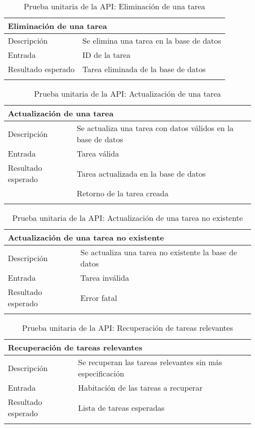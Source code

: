 \begin{longtable}{|p{} p{}|}
    \hline
    \multicolumn{2}{|l|}{\textbf{Eliminación de una tarea}} \\ \hline 
    Descripción                 & Se elimina una tarea en la base de datos \\ \hline
    Entrada                     & ID de la tarea \\ \hline
    Resultado esperado          & Tarea eliminada de la base de datos \\ \hline
    \caption{Prueba unitaria de la API: Eliminación de una tarea}
    \label{cp:u:api:eliminar_tarea}
\end{longtable}

\begin{longtable}{|p{} p{}|}
    \hline
    \multicolumn{2}{|l|}{\textbf{Actualización de una tarea}} \\ \hline 
    Descripción                 & Se actualiza una tarea con datos válidos en la base de datos \\ \hline
    Entrada                     & Tarea válida \\ \hline
    Resultado esperado          & Tarea actualizada en la base de datos \\
                                & Retorno de la tarea creada \\ \hline
    \caption{Prueba unitaria de la API: Actualización de una tarea}
    \label{cp:u:api:actualizar_tarea}
\end{longtable}

\begin{longtable}{|p{} p{}|}
    \hline
    \multicolumn{2}{|l|}{\textbf{Actualización de una tarea no existente}} \\ \hline 
    Descripción                 & Se actualiza una tarea no existente la base de datos \\ \hline
    Entrada                     & Tarea inválida \\ \hline
    Resultado esperado          & Error fatal \\ \hline
    \caption{Prueba unitaria de la API: Actualización de una tarea no existente}
    \label{cp:u:api:actualizar_tarea_no_existente}
\end{longtable}

\begin{longtable}{|p{} p{}|}
    \hline
    \multicolumn{2}{|l|}{\textbf{Recuperación de tareas relevantes}} \\ \hline 
    Descripción                 & Se recuperan las tareas relevantes sin más especificación \\ \hline
    Entrada                     & Habitación de las tareas a recuperar \\ \hline
    Resultado esperado          & Lista de tareas esperadas \\ \hline
    \caption{Prueba unitaria de la API: Recuperación de tareas relevantes}
    \label{cp:u:api:recuperar_tareas}
\end{longtable}

